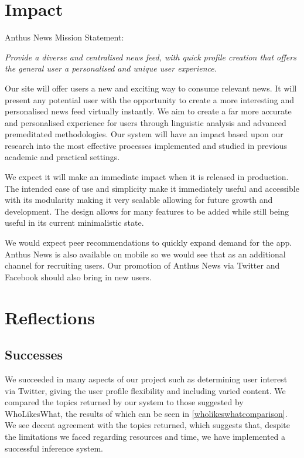 \documentclass[11pt]{article}
\begin{document}
\section{Impact}

Anthus News Mission Statement:
\begin{center}
\textit{Provide a diverse and centralised news feed, with quick profile creation that offers the general user a personalised and unique user experience.}
\end{center}
Our site will offer users a new and exciting way to consume relevant news. It will present any potential user with the opportunity to create a more interesting and personalised news feed virtually instantly. 
We aim to create a far more accurate and personalised experience for users through linguistic analysis and advanced premeditated methodologies. Our system will have an impact based upon our research into the most effective processes implemented and studied in previous academic and practical settings. 

We expect it will make an immediate impact when it is released in production. The intended ease of use and simplicity make it immediately useful and accessible with its modularity making it very scalable allowing for future growth and development. The design allows for many features to be added while still being useful in its current minimalistic state. 

We would expect peer recommendations to quickly expand demand for the app. Anthus News is also available on mobile so we would see that as an additional channel for recruiting users. Our promotion of Anthus News via Twitter and Facebook should also bring in new users.

\section{Reflections}
\subsection{Successes}
We succeeded in many aspects of our project such as determining user interest via Twitter, giving the user profile flexibility and including varied content. We compared the topics returned by our system to those suggested by WhoLikesWhat\cite{wholikeswhat}, the results of which can be seen in \cref{wholikeswhatcomparison}. We see decent agreement with the topics returned, which suggests that, despite the limitations we faced regarding resources and time, we have implemented a successful inference system.
\end{document}
